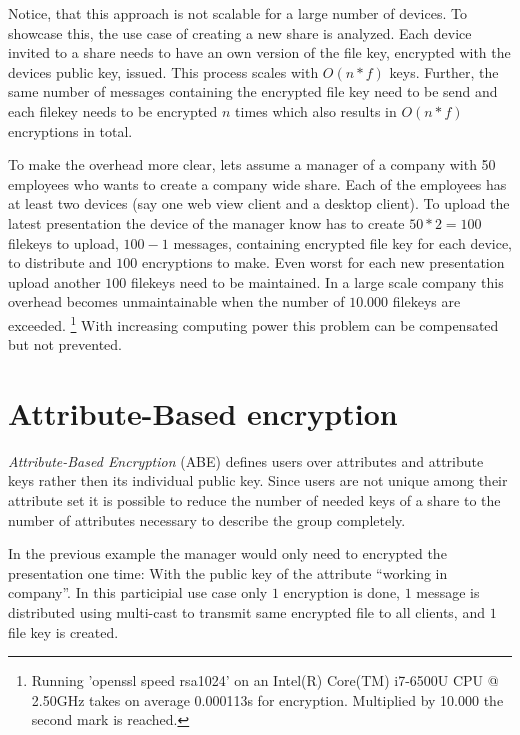 Notice, that this approach is not scalable for a large number of devices. To showcase this, the use case of creating a new share is analyzed. Each device invited to a share needs to have an own version of the file key, encrypted with the devices public key, issued. This process scales with $O(n * f)$ keys. 
Further, the same number of messages containing the encrypted file key need to be send and each filekey needs to be encrypted $n$ times which also results in $O(n * f)$ encryptions in total. 

To make the overhead more clear, lets assume a manager of a company with 50 employees who wants to create a company wide share. Each of the employees has at least two devices (say one web view client and a desktop client). To upload the latest presentation the device of the manager know has to create $50 * 2 = 100$ filekeys to upload, $100-1$ messages, containing encrypted file key for each device, to distribute and $100$ encryptions to make. Even worst for each new presentation upload another $100$ filekeys need to be maintained. In a large scale company this overhead becomes unmaintainable when the number of $10.000$ filekeys are exceeded. \footnote{Running 'openssl speed rsa1024' on an Intel(R) Core(TM) i7-6500U CPU @ 2.50GHz takes on average 0.000113s for encryption. Multiplied by 10.000 the second mark is reached.} With increasing computing power this problem can be compensated but not prevented.

\section{Attribute-Based encryption}
\textit{Attribute-Based Encryption} (\ac{ABE}) defines users over attributes and attribute keys rather then its individual public key. Since users are not unique among their attribute set it is possible to reduce the number of needed keys of a share to the number of attributes necessary to describe the group completely. 

In the previous example the manager would only need to encrypted the presentation one time: With the public key of the attribute “working in company”. In this participial use case only $1$ encryption is done, $1$ message is distributed using multi-cast to transmit same encrypted file to all clients, and $1$ file key is created. 

